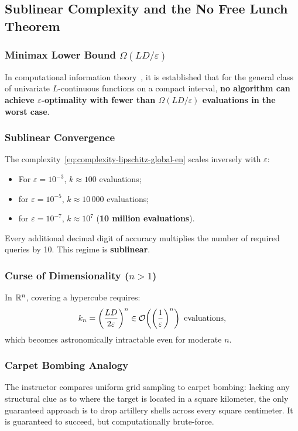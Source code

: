 \subsection{Sublinear Complexity and the No Free Lunch Theorem}

\subsubsection{Minimax Lower Bound $\Omega(LD/\varepsilon)$}
In computational information theory~\cite{nesterov2004introductory}, it is established that for the general class of univariate $L$-continuous functions on a compact interval, \textbf{no algorithm can achieve $\varepsilon$-optimality with fewer than $\Omega(LD/\varepsilon)$ evaluations in the worst case}.

\subsubsection{Sublinear Convergence}
The complexity~\eqref{eq:complexity-lipschitz-global-en} scales inversely with $\varepsilon$:
\begin{itemize}
    \item For $\varepsilon = 10^{-3}$, $k \approx 100$ evaluations;
    \item for $\varepsilon = 10^{-5}$, $k \approx 10\,000$ evaluations;
    \item for $\varepsilon = 10^{-7}$, $k \approx 10^7$ (\textbf{10 million evaluations}).
\end{itemize}
Every additional decimal digit of accuracy multiplies the number of required queries by 10. This regime is \textbf{sublinear}.

\subsubsection{Curse of Dimensionality ($n > 1$)}
In $\mathbb{R}^n$, covering a hypercube requires:
\begin{equation}
    k_n = \left(\frac{LD}{2\varepsilon}\right)^n \in \mathcal{O}\!\left(\left(\frac{1}{\varepsilon}\right)^n\right) \text{ evaluations},
\end{equation}
which becomes astronomically intractable even for moderate $n$.

\subsubsection{Carpet Bombing Analogy}
The instructor compares uniform grid sampling to carpet bombing: lacking any structural clue as to where the target is located in a square kilometer, the only guaranteed approach is to drop artillery shells across every square centimeter. It is guaranteed to succeed, but computationally brute-force.


